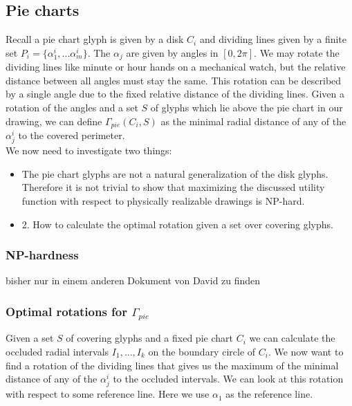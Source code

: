 \documentclass[a4paper,11pt]{article}
\begin{document}
\subsection{Pie charts}

Recall a pie chart glyph is given by a disk $C_i$ and dividing lines given by a finite set $P_i= \{\alpha_1^i,...\alpha_m^i\}$. The $\alpha_j$ are given by angles in $[0,2\pi ]$. We may rotate the dividing lines like minute or hour hands on a mechanical watch, but the relative distance between all angles must stay the same. This rotation can be described by a single angle due to the fixed relative distance of the dividing lines. Given a rotation of the angles and a set $S$ of glyphs which lie above the pie chart in our drawing, we can define $\Gamma_{pie}(C_i,S)$ as the minimal radial distance of any of the $\alpha^i_j$ to the covered perimeter. \\

We now need to investigate two things:

\begin{itemize}
  \item The pie chart glyphs are not a natural generalization of the disk glyphs. Therefore it is not trivial to show that maximizing the discussed utility function with respect to physically realizable drawings is NP-hard.
  \item 2. How to calculate the optimal rotation given a set over covering glyphs.
\end{itemize}

\newpage

\subsubsection*{NP-hardness}

\color{blue}
bisher nur in einem anderen Dokument von David zu finden
\color{black}

\subsubsection*{Optimal rotations for $\Gamma_{pie}$}

Given a set $S$ of covering glyphs and a fixed pie chart $C_i$ we can calculate the occluded radial intervals $I_1,...,I_k$ on the boundary circle of $C_i$. We now want to find a rotation of the dividing lines that gives us the maximum of the minimal distance of any of the $\alpha^i_j$ to the occluded intervals. We can look at this rotation with respect to some reference line. Here we use $\alpha_1$ as the reference line.\\
\end{document}
